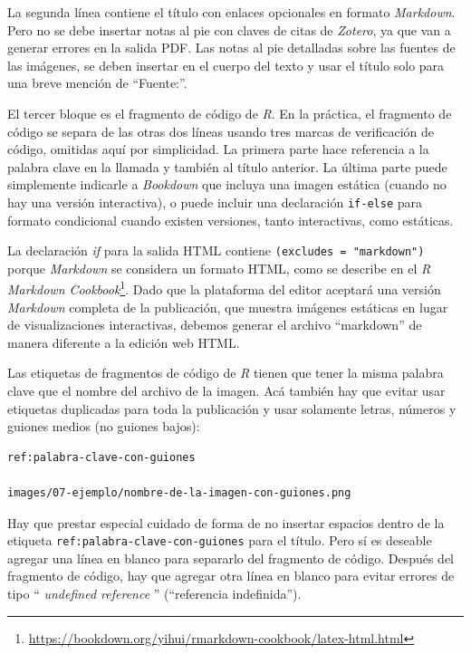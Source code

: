 \documentclass[
]{krantz}
\DeclareRobustCommand{\href}[2]{#2\footnote{\url{#1}}}
\begin{document}
La segunda línea contiene el título con enlaces opcionales en formato \emph{Markdown}. Pero no se debe insertar notas al pie con claves de citas de \emph{Zotero}, ya que van a generar errores en la salida PDF. Las notas al pie detalladas sobre las fuentes de las imágenes, se deben insertar en el cuerpo del texto y usar el título solo para una breve mención de ``Fuente:''.

El tercer bloque es el fragmento de código de \emph{R}. En la práctica, el fragmento de código se separa de las otras dos líneas usando tres marcas de verificación de código, omitidas aquí por simplicidad. La primera parte hace referencia a la palabra clave en la llamada y también al título anterior. La última parte puede simplemente indicarle a \emph{Bookdown} que incluya una imagen estática (cuando no hay una versión interactiva), o puede incluir una declaración \texttt{if-else} para formato condicional cuando existen versiones, tanto interactivas, como estáticas.

La declaración \emph{if} para la salida HTML contiene \texttt{(excludes\ =\ "markdown")} porque \emph{Markdown} se considera un formato HTML, como se describe en el \href{https://bookdown.org/yihui/rmarkdown-cookbook/latex-html.html}{\emph{R Markdown Cookbook}}. Dado que la plataforma del editor aceptará una versión \emph{Markdown} completa de la publicación, que muestra imágenes estáticas en lugar de visualizaciones interactivas, debemos generar el archivo ``markdown'' de manera diferente a la edición web HTML.

Las etiquetas de fragmentos de código de \emph{R} tienen que tener la misma palabra clave que el nombre del archivo de la imagen. Acá también hay que evitar usar etiquetas duplicadas para toda la publicación y usar solamente letras, números y guiones medios (no guiones bajos):

\begin{verbatim}
ref:palabra-clave-con-guiones

images/07-ejemplo/nombre-de-la-imagen-con-guiones.png
\end{verbatim}

Hay que prestar especial cuidado de forma de no insertar espacios dentro de la etiqueta \texttt{ref:palabra-clave-con-guiones} para el título. Pero sí es deseable agregar una línea en blanco para separarlo del fragmento de código. Después del fragmento de código, hay que agregar otra línea en blanco para evitar errores de tipo `` \emph{undefined reference} '' (``referencia indefinida'').
\end{document}
